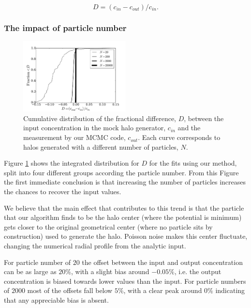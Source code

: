 \documentclass{emulateapj}
\begin{document}
\begin{equation}
D=(c_{in}-c_{out})/c_{in}.
\label{eq:D}
\end{equation}

\subsubsection{The impact of particle number}

\begin{figure}
\begin{center}
  \includegraphics[width=0.50\textwidth]{mock_percentual_diff.pdf}
\end{center}
\caption{Cumulative distribution of the fractional difference, $D$, between
  the input concentration in the mock halo generator, $c_{in}$ and the
  measurement by our MCMC code, $c_{out}$. Each curve corresponds to
  halos generated with a different number of particles, $N$.
    \label{fig:results_mocks}}
\end{figure}

Figure \ref{fig:results_mocks} shows the integrated distribution for
$D$ for the fits using our method, split into four different groups
according the particle number.
From this Figure the first immediate
conclusion is that increasing the number of particles increases the
chances to recover the input values.

We believe that the main effect that contributes to this trend
is that the particle that our algorithm finds to be the halo center
(where the potential is minimum) gets closer to the original
geometrical center (where no particle sits by construction) used to
generate the halo.  Poisson noise makes this center fluctuate,
changing the numerical radial profile from the analytic input.

For particle number of $20$ the offset between the input and output
concentration can be as large as $20\%$, with a slight bias around
$-0.05\%$, i.e. the output concentration is biased towards lower
values than the input.
For particle numbers of $2000$ most of the offsets fall below $5\%$,
with a clear peak around $0\%$ indicating that any appreciable bias is
absent.
\end{document}
